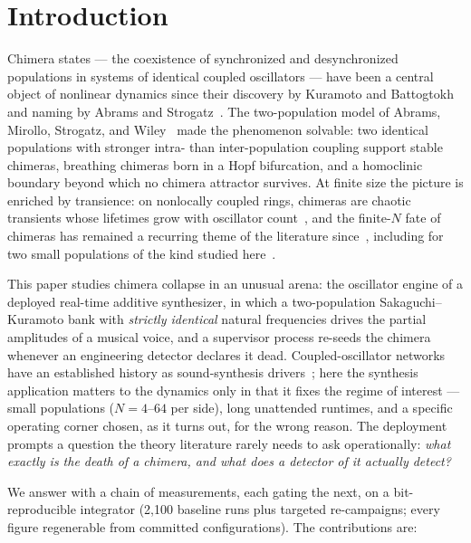 \documentclass[11pt]{article}
\begin{document}
\section{Introduction}\label{sec:intro}

Chimera states --- the coexistence of synchronized and desynchronized populations in
systems of identical coupled oscillators --- have been a central object of nonlinear
dynamics since their discovery by Kuramoto and Battogtokh~\cite{kb2002} and naming by
Abrams and Strogatz~\cite{as2004}. The two-population model of Abrams, Mirollo,
Strogatz, and Wiley~\cite{abrams2008} made the phenomenon solvable: two identical
populations with stronger intra- than inter-population coupling support stable
chimeras, breathing chimeras born in a Hopf bifurcation, and a homoclinic boundary
beyond which no chimera attractor survives. At finite size the picture is enriched by
transience: on nonlocally coupled rings, chimeras are chaotic transients whose
lifetimes grow with oscillator count~\cite{wo2011}, and the finite-$N$ fate of
chimeras has remained a recurring theme of the literature
since~\cite{pa2015,om2018}, including for two small populations of the kind
studied here~\cite{panaggio2016}.

This paper studies chimera collapse in an unusual arena: the oscillator engine of a
deployed real-time additive synthesizer, in which a two-population
Sakaguchi--Kuramoto bank with \emph{strictly identical} natural frequencies drives
the partial amplitudes of a musical voice, and a supervisor process re-seeds the
chimera whenever an engineering detector declares it dead. Coupled-oscillator
networks have an established history as sound-synthesis drivers~\cite{lem2019,lemsmc};
here the synthesis application matters to the dynamics only in that it fixes the
regime of interest --- small populations ($N = 4$--$64$ per side), long unattended
runtimes, and a specific operating corner chosen, as it turns out, for the wrong
reason. The deployment prompts a question the theory literature rarely needs to ask
operationally: \emph{what exactly is the death of a chimera, and what does a detector
of it actually detect?}

We answer with a chain of measurements, each gating the next, on a bit-reproducible
integrator (2{,}100 baseline runs plus targeted re-campaigns; every figure
regenerable from committed configurations). The contributions are:
\end{document}
